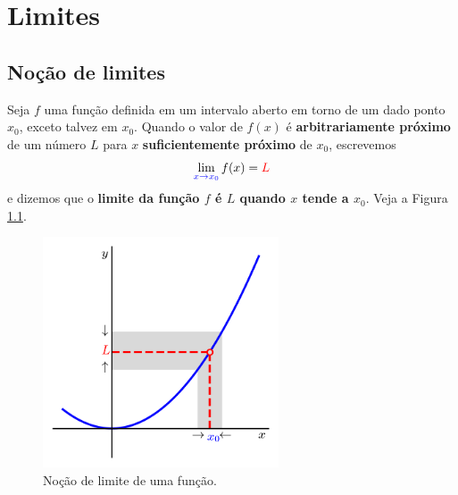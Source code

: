 \chapter{Limites}\label{cap_lim}

\section{Noção de limites}\label{cap_lim_sec_lim}

Seja $f$ uma função definida em um intervalo aberto em torno de um dado ponto $x_0$, exceto talvez em $x_0$. Quando o valor de $f(x)$ é {\bf arbitrariamente próximo} de um número $L$ para $x$ {\bf suficientemente próximo} de $x_0$, escrevemos
\begin{equation}
  \lim_{\color{blue}x\to x_0} f(x) = {\color{red}L}
\end{equation}
e dizemos que o {\bf limite da função $f$ é $L$ quando $x$ tende a $x_0$}. Veja a Figura \ref{fig:lim}.

\begin{figure}[htb]
  \centering
  \includegraphics[width=2.75in]{./cap_lim/dados/fig_lim/fig.png}
  \caption{Noção de limite de uma função.}
  \label{fig:lim}
\end{figure}

